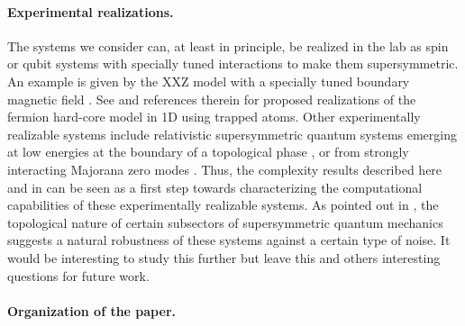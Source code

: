 \documentclass[11pt]{article}
\numberwithin{equation}{section}
\renewcommand\( {\left(}
\renewcommand\) {\right)}
\begin{document}
\paragraph{Experimental realizations.}


The systems we consider can, at least in principle, be realized in the lab as spin or qubit systems with specially tuned interactions to make them supersymmetric. An example is given by the  XXZ model with a specially tuned boundary magnetic field \cite{2004JPhA...37.8937Y}. See \cite{minar2020kink} and references therein for proposed realizations of the fermion hard-core model in 1D using trapped atoms. Other experimentally realizable systems include relativistic supersymmetric quantum systems  emerging at low energies at the boundary of a topological phase \cite{Grover:2013rc}, or from strongly interacting Majorana zero modes \cite{2015PhRvL.115p6401R}.  Thus, the complexity results  described  here and in \cite{Crichigno:2020vue} can be seen as a first step towards characterizing the computational capabilities of these experimentally realizable systems. As pointed out in \cite{Crichigno:2020vue}, the topological nature of certain subsectors of  supersymmetric quantum mechanics suggests a natural robustness of these systems against a certain type of noise. It would be interesting to study this further but leave this and others interesting questions for future work.


\paragraph{Organization of the paper.}
\end{document}
